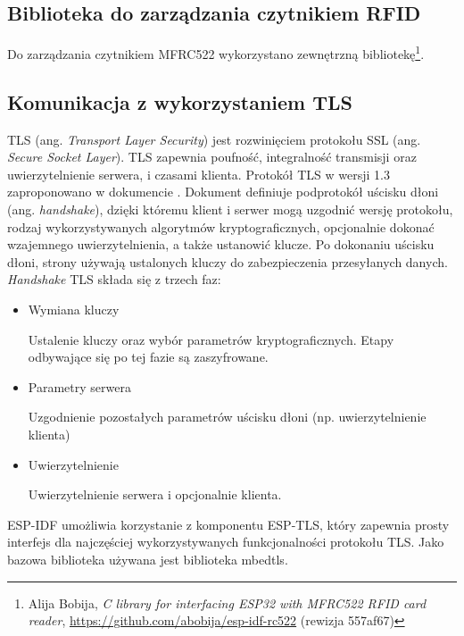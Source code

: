        \subsection{Biblioteka do zarządzania czytnikiem RFID}
        \label{sub:rfid_lib}

            Do zarządzania czytnikiem MFRC522 wykorzystano zewnętrzną bibliotekę\footnote{Alija Bobija, \textit{C library for interfacing ESP32 with MFRC522 RFID card reader}, \url{https://github.com/abobija/esp-idf-rc522} (rewizja 557af67)}.

        \subsection{Komunikacja z wykorzystaniem TLS}
        \label{sub:tls}

            TLS (ang. \textit{Transport Layer Security}) jest rozwinięciem protokołu SSL (ang. \textit{Secure Socket Layer}). TLS zapewnia poufność, integralność transmisji oraz uwierzytelnienie serwera, i czasami klienta. 
            Protokół TLS w wersji 1.3 zaproponowano w dokumencie \cite{rfc8446}. Dokument definiuje podprotokół uścisku dłoni (ang. \textit{handshake}), dzięki któremu klient i serwer mogą uzgodnić wersję protokołu, rodzaj wykorzystywanych algorytmów kryptograficznych, opcjonalnie dokonać wzajemnego uwierzytelnienia, a także ustanowić klucze. Po dokonaniu uścisku dłoni, strony używają ustalonych kluczy do zabezpieczenia przesyłanych danych.
            \textit{Handshake} TLS składa się z trzech faz:

            \begin{itemize}

                \item Wymiana kluczy

                    Ustalenie kluczy oraz wybór parametrów kryptograficznych. Etapy odbywające się po tej fazie są zaszyfrowane.

                \item Parametry serwera

                    Uzgodnienie pozostałych parametrów uścisku dłoni (np. uwierzytelnienie klienta)

                \item Uwierzytelnienie

                    Uwierzytelnienie serwera i opcjonalnie klienta.
            \end{itemize}

            ESP-IDF umożliwia korzystanie z komponentu ESP-TLS, który zapewnia prosty interfejs dla najczęściej wykorzystywanych funkcjonalności protokołu TLS. Jako bazowa biblioteka używana jest biblioteka mbedtls.

